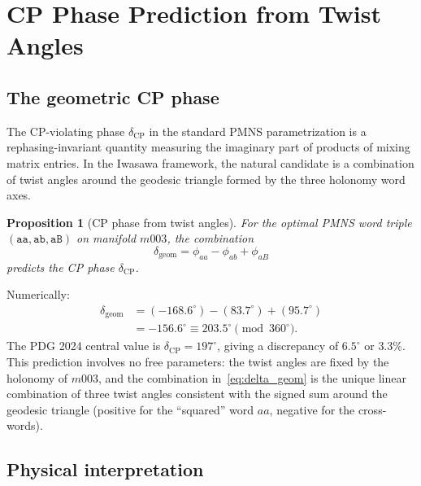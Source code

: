 \documentclass[floatfix,aps,prd,twocolumn,showpacs,superscriptaddress,longbibliography]{revtex4-2}
\newtheorem{proposition}{Proposition}
\begin{document}
\section{CP Phase Prediction from Twist Angles}
\label{sec:prediction}

\subsection{The geometric CP phase}

The CP-violating phase $\delta_{\mathrm{CP}}$ in the standard
PMNS parametrization is a rephasing-invariant quantity measuring
the imaginary part of products of mixing matrix entries.
In the Iwasawa framework, the natural candidate is a combination
of twist angles around the geodesic triangle formed by the three
holonomy word axes.

\begin{proposition}[CP phase from twist angles]
\label{prop:cp_phase}
For the optimal PMNS word triple $(\texttt{aa}, \texttt{ab}, \texttt{aB})$
on manifold $m003$, the combination
\begin{equation}
\delta_{\mathrm{geom}} = \phi_{aa} - \phi_{ab} + \phi_{aB}
\label{eq:delta_geom}
\end{equation}
predicts the CP phase $\delta_{\mathrm{CP}}$.
\end{proposition}

Numerically:
\begin{align}
\delta_{\mathrm{geom}} &= (-168.6^\circ) - (83.7^\circ) + (95.7^\circ) \nonumber \\
&= -156.6^\circ \equiv 203.5^\circ \pmod{360^\circ}.
\label{eq:delta_num}
\end{align}
The PDG 2024 central value is $\delta_{\mathrm{CP}} = 197^\circ$,
giving a discrepancy of $6.5^\circ$ or $3.3\%$.
This prediction involves no free parameters: the twist angles
are fixed by the holonomy of $m003$, and the combination
in~\eqref{eq:delta_geom} is the unique linear combination
of three twist angles consistent with the signed sum around
the geodesic triangle (positive for the ``squared'' word $aa$,
negative for the cross-words).

\subsection{Physical interpretation}
\end{document}
